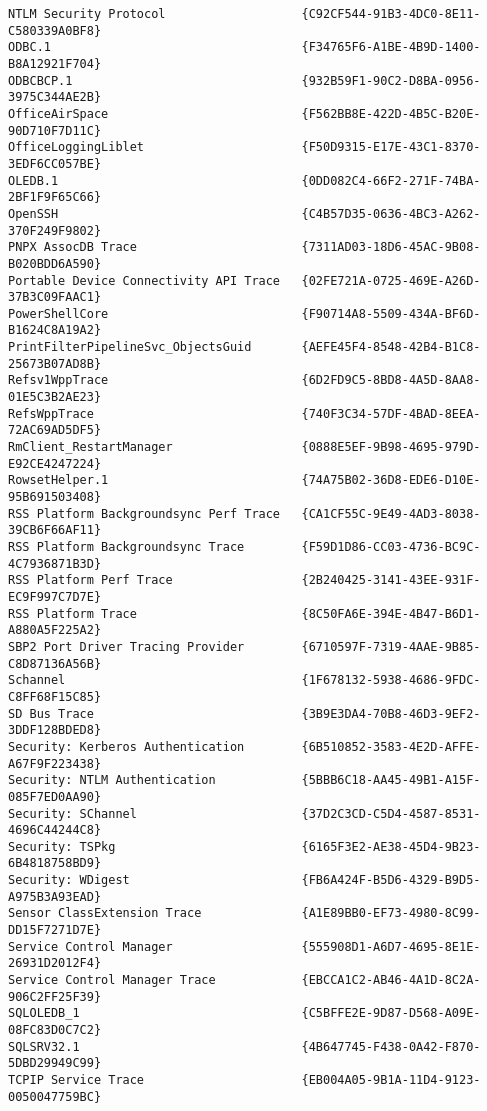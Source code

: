\documentclass{report}
\begin{document}
\begin{lstlisting}[breaklines=true,basicstyle=\tiny]
NTLM Security Protocol                   {C92CF544-91B3-4DC0-8E11-C580339A0BF8}
ODBC.1                                   {F34765F6-A1BE-4B9D-1400-B8A12921F704}
ODBCBCP.1                                {932B59F1-90C2-D8BA-0956-3975C344AE2B}
OfficeAirSpace                           {F562BB8E-422D-4B5C-B20E-90D710F7D11C}
OfficeLoggingLiblet                      {F50D9315-E17E-43C1-8370-3EDF6CC057BE}
OLEDB.1                                  {0DD082C4-66F2-271F-74BA-2BF1F9F65C66}
OpenSSH                                  {C4B57D35-0636-4BC3-A262-370F249F9802}
PNPX AssocDB Trace                       {7311AD03-18D6-45AC-9B08-B020BDD6A590}
Portable Device Connectivity API Trace   {02FE721A-0725-469E-A26D-37B3C09FAAC1}
PowerShellCore                           {F90714A8-5509-434A-BF6D-B1624C8A19A2}
PrintFilterPipelineSvc_ObjectsGuid       {AEFE45F4-8548-42B4-B1C8-25673B07AD8B}
Refsv1WppTrace                           {6D2FD9C5-8BD8-4A5D-8AA8-01E5C3B2AE23}
RefsWppTrace                             {740F3C34-57DF-4BAD-8EEA-72AC69AD5DF5}
RmClient_RestartManager                  {0888E5EF-9B98-4695-979D-E92CE4247224}
RowsetHelper.1                           {74A75B02-36D8-EDE6-D10E-95B691503408}
RSS Platform Backgroundsync Perf Trace   {CA1CF55C-9E49-4AD3-8038-39CB6F66AF11}
RSS Platform Backgroundsync Trace        {F59D1D86-CC03-4736-BC9C-4C7936871B3D}
RSS Platform Perf Trace                  {2B240425-3141-43EE-931F-EC9F997C7D7E}
RSS Platform Trace                       {8C50FA6E-394E-4B47-B6D1-A880A5F225A2}
SBP2 Port Driver Tracing Provider        {6710597F-7319-4AAE-9B85-C8D87136A56B}
Schannel                                 {1F678132-5938-4686-9FDC-C8FF68F15C85}
SD Bus Trace                             {3B9E3DA4-70B8-46D3-9EF2-3DDF128BDED8}
Security: Kerberos Authentication        {6B510852-3583-4E2D-AFFE-A67F9F223438}
Security: NTLM Authentication            {5BBB6C18-AA45-49B1-A15F-085F7ED0AA90}
Security: SChannel                       {37D2C3CD-C5D4-4587-8531-4696C44244C8}
Security: TSPkg                          {6165F3E2-AE38-45D4-9B23-6B4818758BD9}
Security: WDigest                        {FB6A424F-B5D6-4329-B9D5-A975B3A93EAD}
Sensor ClassExtension Trace              {A1E89BB0-EF73-4980-8C99-DD15F7271D7E}
Service Control Manager                  {555908D1-A6D7-4695-8E1E-26931D2012F4}
Service Control Manager Trace            {EBCCA1C2-AB46-4A1D-8C2A-906C2FF25F39}
SQLOLEDB_1                               {C5BFFE2E-9D87-D568-A09E-08FC83D0C7C2}
SQLSRV32.1                               {4B647745-F438-0A42-F870-5DBD29949C99}
TCPIP Service Trace                      {EB004A05-9B1A-11D4-9123-0050047759BC}

\end{lstlisting}
\end{document}
